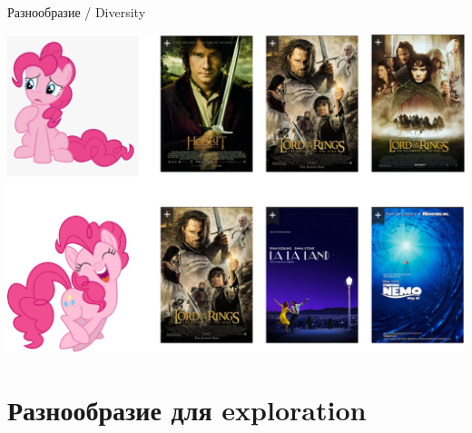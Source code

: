 \documentclass[11pt,aspectratio=169,handout]{beamer}
\begin{document}
\begin{frame}{Разнообразие / Diversity}

\begin{center}
\includegraphics[scale=0.22]{images/diversity.png}
\end{center}

\end{frame}

\section{Разнообразие для exploration}
\end{document}

